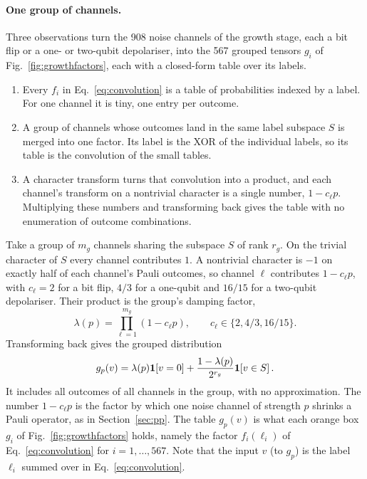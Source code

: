 \paragraph{One group of channels.} 
Three observations turn the 908 noise channels of the growth stage, each a bit flip or a one- or two-qubit depolariser, into the 567 grouped tensors $g_i$ of Fig.~\ref{fig:growthfactors}, each with a closed-form table over its labels.
\begin{enumerate}
\item Every $f_i$ in Eq.~\eqref{eq:convolution} is a table of probabilities indexed by a label. For one channel it is tiny, one entry per outcome.
\item A group of channels whose outcomes land in the same label subspace $S$ is merged into one factor. Its label is the XOR of the individual labels, so its table is the convolution of the small tables.
\item A character transform turns that convolution into a product, and each channel's transform on a nontrivial character is a single number, $1-c_\ell p$. Multiplying these numbers and transforming back gives the table with no enumeration of outcome combinations.
\end{enumerate}
Take a group of $m_g$ channels sharing the subspace $S$ of rank $r_g$. On the trivial character of $S$ every channel contributes $1$. A nontrivial character is $-1$ on exactly half of each channel's Pauli outcomes, so channel $\ell$ contributes $1-c_\ell p$, with $c_\ell=2$ for a bit flip, $4/3$ for a one-qubit and $16/15$ for a two-qubit depolariser. Their product is the group's damping factor,
\begin{equation}
 \lambda(p)=\prod_{\ell=1}^{m_g}(1-c_\ell p),\qquad
 c_\ell\in\{2,4/3,16/15\}.
 \label{eq:damping}
\end{equation}
Transforming back gives the grouped distribution
\begin{equation}
 g_p(v)=\lambda(p)\mathbf1\!\left[v=0\right]
        +\frac{1-\lambda(p)}{2^{r_g}}\mathbf1\!\left[v\in S\right].
 \label{eq:group}
\end{equation}
It includes all outcomes of all channels in the group, with no approximation. The number $1-c_\ell p$ is the factor by which one noise channel of strength $p$ shrinks a Pauli operator, as in Section~\ref{sec:pp}. The table $g_p(v)$ is what each orange box $g_i$ of Fig.~\ref{fig:growthfactors} holds, namely the factor $f_i(\ell_i)$ of Eq.~\eqref{eq:convolution} for $i=1,\dots,567$.
Note that the input $v$ (to $g_p$) is the label $\ell_i$ summed over in Eq.~\eqref{eq:convolution}.


